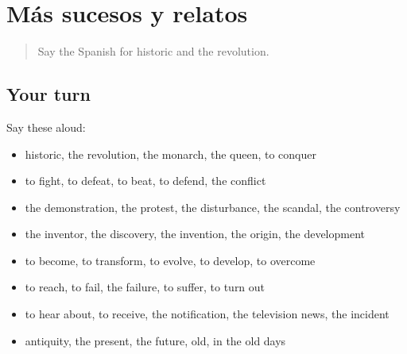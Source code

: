 \section[(dialogue)]{Más sucesos y relatos}

\label{lesson:ES-R575-repaso-568-575}



\begin{quote}
Say the Spanish for historic and the revolution.
\end{quote}

\subsection*{Your turn}
Say these aloud:

\begin{itemize}
\raggedright
  \item historic, the revolution, the monarch, the queen, to conquer
  \item to fight, to defeat, to beat, to defend, the conflict
  \item the demonstration, the protest, the disturbance, the scandal, the controversy
  \item the inventor, the discovery, the invention, the origin, the development
  \item to become, to transform, to evolve, to develop, to overcome
  \item to reach, to fail, the failure, to suffer, to turn out
  \item to hear about, to receive, the notification, the television news, the incident
  \item antiquity, the present, the future, old, in the old days
\end{itemize}

